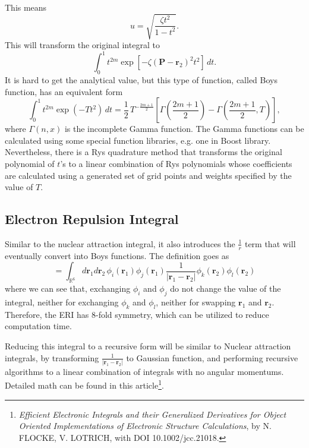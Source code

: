 \documentclass[12pt,a4paper,openany,twoside]{article}
\numberwithin{equation}{section}
\begin{document}
This means
\begin{equation}
    u = \sqrt{\frac{\zeta t^2}{1-t^2}}.
\end{equation}
This will transform the original integral to
\[
    \int_0^1 t^{2m} \exp\left[-\zeta (\boldsymbol{P}-\boldsymbol{r}_2)^2t^2\right]\, dt.
\]
It is hard to get the analytical value, but this type of function, called Boys function, has an equivalent form
\begin{equation}
    \int _0^1 t^{2m} \exp(-Tt^2) \, dt = \frac{1}{2} \, T^{-\frac{2m+1}{2}}\left[\Gamma\left(\frac{2m+1}{2}\right) -  \Gamma\left(\frac{2m+1}{2},T\right)\right],
\end{equation}
where $\Gamma(n,x)$ is the incomplete Gamma function. The Gamma functions can be calculated using some special function libraries, e.g. one in Boost library. Nevertheless, there is a Rys quadrature method that transforms the original polynomial of $t$'s to a linear combination of Rys polynomials whose coefficients are calculated using a generated set of grid points and weights specified by the value of $T$.

\subsection{Electron Repulsion Integral}
Similar to the nuclear attraction integral, it also introduces the $\frac{1}{r}$ term that will eventually convert into Boys functions. The definition goes as
\begin{equation}
    [ij|kl] = \int_{\mathbb{R}^6} d\boldsymbol{r}_1 d\boldsymbol{r}_2\, \phi_i(\boldsymbol{r}_1) \phi_j(\boldsymbol{r}_1) \frac{1}{|\boldsymbol{r}_1 - \boldsymbol{r}_2|} \phi_k(\boldsymbol{r}_2) \phi_l(\boldsymbol{r}_2) 
\end{equation}
where we can see that, exchanging $\phi_i$ and $\phi_j$ do not change the value of the integral, neither for exchanging $\phi_k$ and $\phi_l$, neither for swapping $\boldsymbol{r}_1$ and $\boldsymbol{r}_2$. Therefore, the ERI has 8-fold symmetry, which can be utilized to reduce computation time.  

Reducing this integral to a recursive form will be similar to Nuclear attraction integrals, by transforming $\frac{1}{|\boldsymbol{r}_1 - \boldsymbol{r}_2 |}$ to Gaussian function, and performing recursive algorithms to a linear combination of integrals with no angular momentums. Detailed math can be found in this article\footnote{\emph{Efficient Electronic Integrals and their Generalized Derivatives for Object Oriented Implementations of Electronic Structure Calculations}, by N. FLOCKE, V. LOTRICH, with DOI 10.1002/jcc.21018.}.
\end{document}

